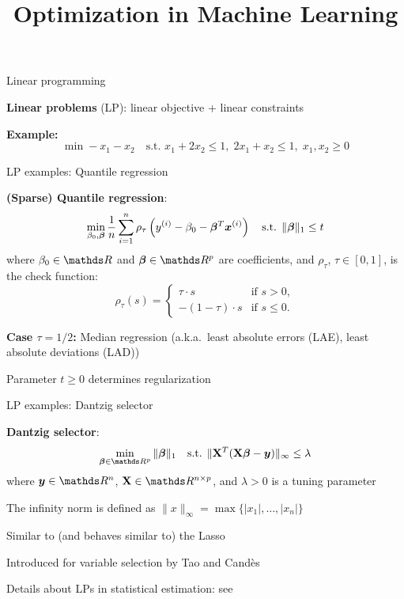 \documentclass[11pt,compress,t,notes=noshow, xcolor=table]{beamer}
\title{Optimization in Machine Learning}
\begin{document}

\begin{framei}{Linear programming}
\item \textbf{Linear problems} (LP): linear objective + linear constraints
\item \textbf{Example:}
$$
\min - x_1 - x_2 \quad \text{s.t. } x_1 + 2x_2 \le 1, \; 2x_1 + x_2 \le 1, \; x_1, x_2 \ge 0
$$
\end{framei}


\begin{framei}{LP examples: Quantile regression}
\item \textbf{(Sparse) Quantile regression}:
$$
\min_{\beta_0,\bm{\beta}} \frac{1}{n}\sum\limits_{i=1}^n \rho_\tau \left(y^{(i)} - \beta_0 -  \bm{\beta}^T\bm{x}^{(i)}\right) \quad \text{s.t. } \|\bm{\beta}\|_1 \le t
$$
where $\beta_0 \in \R$ and $\bm{\beta} \in \R^p$ are coefficients, and $\rho_\tau$, $\tau \in [0,1]$, is the check function:
$$
\rho_\tau(s) =
\begin{cases}
\tau \cdot s & \text{if } s>0, \\
-(1-\tau)\cdot s & \text{if } s\le0.
\end{cases}
$$
\item \textbf{Case $\tau = 1/2$:} Median regression (a.k.a.\ least absolute errors (LAE), least absolute deviations (LAD))
\item Parameter $t \geq 0$ determines regularization
\end{framei}


\begin{framei}{LP examples: Dantzig selector}
\item \textbf{Dantzig selector}:
$$
\min_{\bm{\beta}\in \R^p} \|\bm{\beta}\|_1 \quad \text{s.t. } \| \Xmat^T (\Xmat \bm{\beta} - \yv)\|_\infty \le \lambda
$$
where $\yv \in \R^n$, $\Xmat \in \R^{n \times p}$, and $\lambda > 0$ is a tuning parameter
\item The infinity norm is defined as $\| x \|_\infty = \max\{|x_1|, \dots, |x_n|\}$
\item Similar to (and behaves similar to) the Lasso
\item Introduced for variable selection by Tao and Cand\`es
\item Details about LPs in statistical estimation: see \href{https://etd.ohiolink.edu/apexprod/rws_etd/send_file/send?accession=osu1222035715&disposition=inline}{}
\end{framei}
\end{document}
